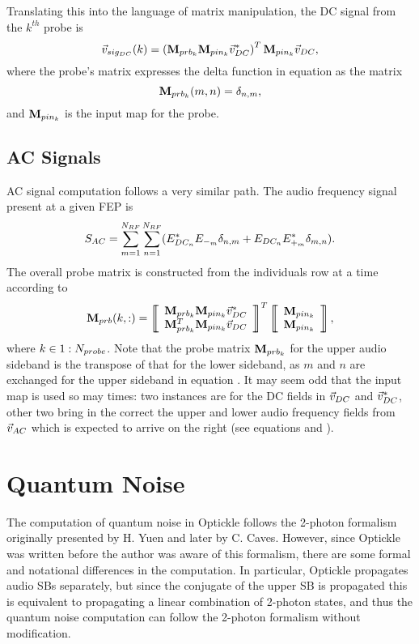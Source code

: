 \documentclass[12pt]{article}
\begin{document}
Translating this into the language of matrix manipulation, the DC signal from the $k^{th}$ probe is
\begin{equation}
\vec{v}_{sig_{DC}}(k) = \left( \mathbf{M}_{prb_{k}} \mathbf{M}_{pin_{k}} \vec{v}_{DC}^* \right) ^T \mathbf{M}_{pin_{k}} \vec{v}_{DC},
\end{equation}
where the probe's matrix expresses the delta function in equation  as the matrix
\begin{equation}
\mathbf{M}_{prb_{k}}(m,n) = \delta_{n,m} ,
\end{equation}
and $\mathbf{M}_{pin_{k}}$ is the input map for the probe.

\subsection{AC Signals}
AC signal computation follows a very similar path.
The audio frequency signal present at a given FEP is
\begin{equation}
S_{AC} = \sum^{\Nrf}_{m = 1} \sum^{\Nrf}_{n = 1}
(E^*_{DC_n} E_{-_m} \delta_{n,m} + E_{DC_n} E^*_{+_m} \delta_{m,n} ) .
\elabel{sac}
\end{equation}
The overall probe matrix is constructed from the individuals row at a time according to
\begin{equation}
\mPrb(k,:) =
\matrixBegin{c}
\mPrbn{k} \mPrbInn{k} \vDC^* \\
\mPrbn{k}^T \mPrbInn{k} \vDC
\matrixEnd ^T
\matrixBegin{c}
\mPrbInn{k} \\
\mPrbInn{k}
\matrixEnd ,
\end{equation}
where $k \in 1:N_{probe}$.
Note that the probe matrix $\mathbf{M}_{prb_{k}}$ for the upper audio sideband is the transpose of that for the lower sideband, as $m$ and $n$ are exchanged for the upper sideband in equation .
It may seem odd that the input map is used so may times: two instances are for the DC fields in $\vec{v}_{DC}$ and $\vec{v}_{DC}^*$, other two bring in the correct the upper and lower audio frequency fields from $\vec{v}_{AC}$ which is expected to arrive on the right (see equations  and ).

\section{Quantum Noise}

The computation of quantum noise in Optickle follows the 2-photon formalism
 originally presented by H. Yuen and later by C. Caves.
However, since Optickle was written before the author was aware of this formalism,
 there are some formal and notational differences in the computation.
In particular, Optickle propagates audio SBs separately, but since the conjugate of the upper SB
 is propagated this is equivalent to propagating a linear combination of 2-photon states,
 and thus the quantum noise computation can follow the 2-photon formalism without modification.
\end{document}
